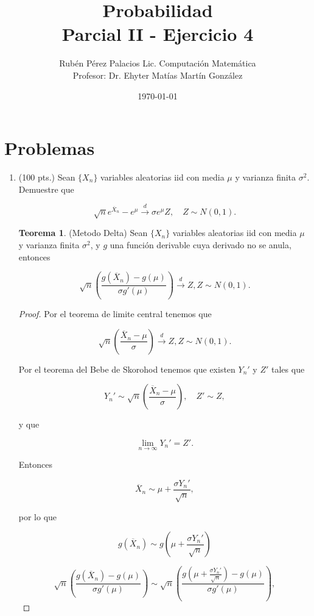 \documentclass[letterpaper]{article}
\title{Probabilidad \\Parcial II - Ejercicio 4}
\author{Rubén Pérez Palacios Lic. Computación Matemática\\Profesor: Dr. Ehyter Matías Martín González}
\date{\today}
\theoremstyle{definition}
\theoremstyle{lemathm}
\theoremstyle{lemathm}
\newtheorem{theo}{Teorema}
\theoremstyle{lemademthm}
\newcommand{\limninf}{\lim_{n\to\infty}}
\newcommand{\pars}[1]{\left( #1 \right) }
\newcommand{\1}{\mathbbm{1}}
\begin{document}
	\maketitle
    
    \section*{Problemas}

    \begin{enumerate}
        
		\item (100 pts.) Sean $\{X_n\}$ variables aleatorias iid con media $\mu$ y varianza finita $\sigma^2$. Demuestre que 
		
		\[\sqrt{n} e^{\overline{X}_n}-e^\mu \overset{d}{\to} \sigma e^\mu Z,\quad Z\sim N(0,1).\]

		\begin{theo}
			
			(Metodo Delta) Sean $\{X_n\}$ variables aleatorias iid con media $\mu$ y varianza finita $\sigma^2$, y $g$ una función derivable cuya derivado no se anula, entonces
			
			\[\sqrt{n} \pars{\frac{g\pars{\overline{X}_n} - g\pars{\mu}}{\sigma g'(\mu)}} \xrightarrow{d} Z, Z \sim N(0,1).\]
		
		\end{theo}
		
		\begin{proof}
			Por el teorema de limite central tenemos que

			\[\sqrt{n} \pars{\frac{\overline{X}_n - \mu}{\sigma}} \xrightarrow{d} Z, Z \sim N(0,1).\]

			Por el teorema del Bebe de Skorohod tenemos que existen $Y_n'$ y $Z'$ tales que

			\[Y_n' \sim \sqrt{n} \pars{\frac{\overline{X}_n - \mu}{\sigma}}, \quad Z' \sim Z,\]

			y que

			\[\limninf Y_n' = Z'.\]
			
			Entonces

			\[\overline{X}_n \sim \mu + \frac{\sigma Y_n'}{\sqrt{n}},\]

			por lo que

			\[g\pars{\overline{X}_n} \sim g\pars{\mu + \frac{\sigma Y_n'}{\sqrt{n}}}\]

			\[\sqrt{n} \pars{\frac{g\pars{\overline{X}_n} - g\pars{\mu}}{\sigma g'(\mu)}} \sim \sqrt{n} \pars{\frac{g\pars{\mu + \frac{\sigma Y_n'}{\sqrt{n}}} - g\pars{\mu}}{\sigma g'(\mu)}},\]


\end{proof}
\end{enumerate}
\end{document}
